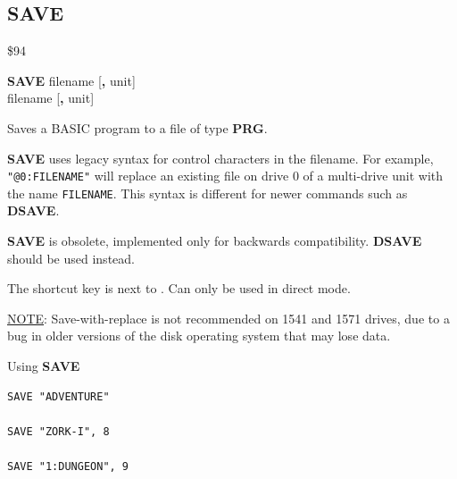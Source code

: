 \subsection{SAVE}
\begin{description}[leftmargin=2cm,style=nextline]
\item [Token:]    \$94

\item [Format:]   {\bf SAVE} filename [{\bf,} unit] \\
                  \megakeywhite{$\leftarrow$} filename [{\bf,} unit]

\item [Usage:]    Saves a BASIC program to a file of type {\bf PRG}.

                  \filenamedefinition

                  {\bf SAVE} uses legacy syntax for control characters in the filename. For example, \texttt{"@0:FILENAME"} will replace an existing file on drive 0 of a multi-drive unit with the name \texttt{FILENAME}. This syntax is different for newer commands such as {\bf DSAVE}.

                  \unitdefinition

\item [Remarks:]  {\bf SAVE} is obsolete, implemented only for backwards compatibility. {\bf DSAVE} should be used instead.
                 
                  The shortcut key \megakeywhite{$\leftarrow$} is next to . Can only be used in direct mode.

                  \underline{NOTE}: Save-with-replace is not recommended on 1541 and 1571 drives, due to a bug in older versions of the disk operating system that may lose data.

\item [Examples:] Using {\bf SAVE}

\begin{tcolorbox}[colback=black,coltext=white]
\verbatimfont{\codefont}
\begin{verbatim}
SAVE "ADVENTURE"

SAVE "ZORK-I", 8

SAVE "1:DUNGEON", 9
\end{verbatim}
\end{tcolorbox}
\end{description}


\newpage
